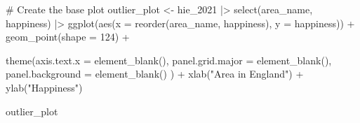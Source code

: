\documentclass[
  letterpaper,
]{krantz}
\makeatletter
\newenvironment{Shaded}{\begin{snugshade}}{\end{snugshade}}
\newcommand{\AttributeTok}[1]{\textcolor[rgb]{0.40,0.45,0.13}{#1}}
\newcommand{\CommentTok}[1]{\textcolor[rgb]{0.37,0.37,0.37}{#1}}
\newcommand{\DecValTok}[1]{\textcolor[rgb]{0.68,0.00,0.00}{#1}}
\newcommand{\FunctionTok}[1]{\textcolor[rgb]{0.28,0.35,0.67}{#1}}
\newcommand{\NormalTok}[1]{\textcolor[rgb]{0.00,0.23,0.31}{#1}}
\newcommand{\OtherTok}[1]{\textcolor[rgb]{0.00,0.23,0.31}{#1}}
\newcommand{\SpecialCharTok}[1]{\textcolor[rgb]{0.37,0.37,0.37}{#1}}
\newcommand{\StringTok}[1]{\textcolor[rgb]{0.13,0.47,0.30}{#1}}
\newenvironment{kframe}{%
\medskip{}
\setlength{\fboxsep}{.8em}
 \def\at@end@of@kframe{}%
 \ifinner\ifhmode%
  \def\at@end@of@kframe{\end{minipage}}%
  \begin{minipage}{\columnwidth}%
 \fi\fi%
 \def\FrameCommand##1{\hskip\@totalleftmargin \hskip-\fboxsep
 \colorbox{shadecolor}{##1}\hskip-\fboxsep
     \hskip-\linewidth \hskip-\@totalleftmargin \hskip\columnwidth}%
 \MakeFramed {\advance\hsize-\width
   \@totalleftmargin\z@ \linewidth\hsize
   \@setminipage}}%
 {\par\unskip\endMakeFramed%
 \at@end@of@kframe}
\renewenvironment{Shaded}{\begin{kframe}}{\end{kframe}}
\makeatother
\begin{document}
\begin{Shaded}
\begin{Highlighting}[]
\CommentTok{\# Create the base plot}
\NormalTok{outlier\_plot }\OtherTok{\textless{}{-}}
\NormalTok{  hie\_2021 }\SpecialCharTok{|\textgreater{}}
  \FunctionTok{select}\NormalTok{(area\_name, happiness) }\SpecialCharTok{|\textgreater{}}
  \FunctionTok{ggplot}\NormalTok{(}\FunctionTok{aes}\NormalTok{(}\AttributeTok{x =} \FunctionTok{reorder}\NormalTok{(area\_name, happiness),}
             \AttributeTok{y =}\NormalTok{ happiness)) }\SpecialCharTok{+}
  \FunctionTok{geom\_point}\NormalTok{(}\AttributeTok{shape =} \DecValTok{124}\NormalTok{) }\SpecialCharTok{+}
  
  \FunctionTok{theme}\NormalTok{(}\AttributeTok{axis.text.x =} \FunctionTok{element\_blank}\NormalTok{(),}
        \AttributeTok{panel.grid.major =} \FunctionTok{element\_blank}\NormalTok{(),}
        \AttributeTok{panel.background =} \FunctionTok{element\_blank}\NormalTok{()}
\NormalTok{  ) }\SpecialCharTok{+}
  \FunctionTok{xlab}\NormalTok{(}\StringTok{"Area in England"}\NormalTok{) }\SpecialCharTok{+}
  \FunctionTok{ylab}\NormalTok{(}\StringTok{"Happiness"}\NormalTok{)}

\NormalTok{outlier\_plot}
\end{Highlighting}
\end{Shaded}

\begin{figure}[H]


\caption{\label{fig-deviation-plot-happiness}}

\end{figure}%
\end{document}
